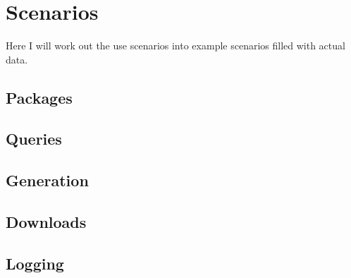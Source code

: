 \newpage
\section{Scenarios}  
Here I will work out the use scenarios into example scenarios filled with actual
data.


\subsection{Packages}







\subsection{Queries}














\subsection{Generation}




\subsection{Downloads}






\subsection{Logging}







